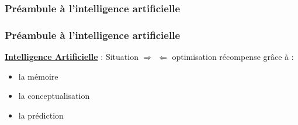 \documentclass{formation}
\begin{document}
\begin{frame}
  \frametitle{Préambule à l'intelligence artificielle}
  \begin{center}
    \huge{}
  \end{center}
\end{frame}

\begin{frame}
  \frametitle{Préambule à l'intelligence artificielle}
  \underline{\textbf{Intelligence Artificielle}} :
  \newline
  \newline
  Situation $\Rightarrow$  $\Leftarrow$ optimisation récompense
  \newline
  grâce à :
  \begin{itemize}
  \item la mémoire
  \item la conceptualisation
  \item la prédiction
  \end{itemize}
\end{frame}
\end{document}
